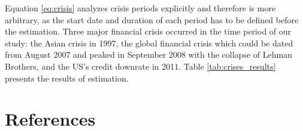 \documentclass[preprint,authoryear,11pt]{elsarticle}
\begin{document}
\noindent Equation \eqref{eq:crisis} analyzes crisis periods explicitly and therefore is more arbitrary, as the start date and duration of each period has to be defined before the estimation. Three major financial crisis occurred in the time period of our study: the Asian crisis in 1997, the global financial crisis which could be dated from August 2007 and peaked in September 2008 with the collapse of Lehman Brothers, and the US's credit downrate in 2011. 
Table \ref{tab:crises_results} presents the results of estimation. 

\section{References}
\label{sec:refs}



\end{document}
